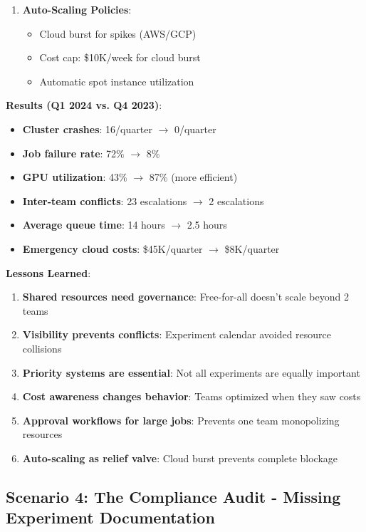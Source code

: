 \begin{enumerate}
    \item \textbf{Auto-Scaling Policies}:
    \begin{itemize}
        \item Cloud burst for spikes (AWS/GCP)
        \item Cost cap: \$10K/week for cloud burst
        \item Automatic spot instance utilization
    \end{itemize}
\end{enumerate}

\textbf{Results (Q1 2024 vs. Q4 2023)}:

\begin{itemize}
    \item \textbf{Cluster crashes}: 16/quarter $\rightarrow$ 0/quarter
    \item \textbf{Job failure rate}: 72\% $\rightarrow$ 8\%
    \item \textbf{GPU utilization}: 43\% $\rightarrow$ 87\% (more efficient)
    \item \textbf{Inter-team conflicts}: 23 escalations $\rightarrow$ 2 escalations
    \item \textbf{Average queue time}: 14 hours $\rightarrow$ 2.5 hours
    \item \textbf{Emergency cloud costs}: \$45K/quarter $\rightarrow$ \$8K/quarter
\end{itemize}

\textbf{Lessons Learned}:

\begin{enumerate}
    \item \textbf{Shared resources need governance}: Free-for-all doesn't scale beyond 2 teams
    \item \textbf{Visibility prevents conflicts}: Experiment calendar avoided resource collisions
    \item \textbf{Priority systems are essential}: Not all experiments are equally important
    \item \textbf{Cost awareness changes behavior}: Teams optimized when they saw costs
    \item \textbf{Approval workflows for large jobs}: Prevents one team monopolizing resources
    \item \textbf{Auto-scaling as relief valve}: Cloud burst prevents complete blockage
\end{enumerate}

\subsection{Scenario 4: The Compliance Audit - Missing Experiment Documentation}

